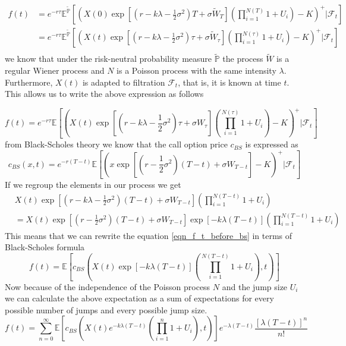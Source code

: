 \documentclass[times, utf8, diplomski]{fer}
\begin{document}
\begin{align*}
	f(t) &= e^{-r\tau} \mathbb{E}^{\tilde{\mathbb{P}}}\left[\left(X(0)\exp\left[ (r - k\lambda- \frac{1}{2}\sigma^2)T + \sigma \tilde{W}_{T} \right]\left(\prod_{i=1}^{N(T)}1+U_i\right) - K \right)^+\Bigg|\mathcal{F}_t\right] \\
		 &= e^{-r\tau} \mathbb{E}^{\tilde{\mathbb{P}}}\left[\left(X(t)\exp\left[ (r - k\lambda- \frac{1}{2}\sigma^2)\tau + \sigma \tilde{W}_{\tau} \right]\left(\prod_{i=1}^{N(\tau)}1+U_i\right) - K \right)^+\Bigg|\mathcal{F}_t\right] \\
\end{align*} we know that under the risk-neutral probability measure $\tilde{\mathbb{P}}$ the process $\tilde{W}$ is a regular Wiener process and $N$ is a Poisson process with the same intensity $\lambda$. Furthermore, $X(t)$ is adapted to filtration $\mathcal{F}_t$, that is, it is known at time $t$. This allows us to write the above expression as follows


\begin{equation} \label{eqn_f_t_before_bs}
	f(t) = e^{-r\tau} \mathbb{E}\left[\left(X(t)\exp\left[ (r - k\lambda- \frac{1}{2}\sigma^2)\tau + \sigma W_{\tau} \right]\left(\prod_{i=1}^{N(\tau)}1+U_i\right) - K \right)^+\Bigg|\mathcal{F}_t\right]
\end{equation} from Black-Scholes theory we know that the call option price $c_{BS}$ is expressed as 
\begin{equation*}
	c_{BS}(x,t) = e^{-r(T-t)} \mathbb{E}\left[\left(x\exp\left[ (r - \frac{1}{2}\sigma^2)(T-t) + \sigma W_{T-t} \right] - K \right)^+\Bigg|\mathcal{F}_t\right]
\end{equation*} If we regroup the elements in our process we get 
\begin{align*}
	&X(t)\exp\left[ (r - k\lambda- \frac{1}{2}\sigma^2)(T-t) + \sigma W_{T-t} \right]\left(\prod_{i=1}^{N(T-t)}1+U_i\right) \\
	&= X(t)\exp\left[ (r - \frac{1}{2}\sigma^2)(T-t) + \sigma W_{T-t} \right]\exp\left[ -k\lambda(T-t) \right]\left(\prod_{i=1}^{N(T-t)}1+U_i\right)
\end{align*} This means that we can rewrite the equation \ref{eqn_f_t_before_bs} in terms of Black-Scholes formula
\begin{equation}
	f(t) = \mathbb{E}\left[c_{BS}\left(X(t)\exp\left[ -k\lambda(T-t) \right]\left(\prod_{i=1}^{N(T-t)}1+U_i\right), t\right)\right]
\end{equation} Now because of the independence of the Poisson process $N$ and the jump size $U_i$ we can calculate the above expectation as a sum of expectations for every possible number of jumps and every possible jump size.
\begin{equation}
	f(t) = \sum_{n=0}^{\infty}\mathbb{E}\left[c_{BS}\left(X(t)e^{-k\lambda(T-t)}\left(\prod_{i=1}^{n}1+U_i\right), t\right)\right]e^{-\lambda(T-t)}\frac{[\lambda(T-t)]^n}{n!}
\end{equation}
\end{document}
